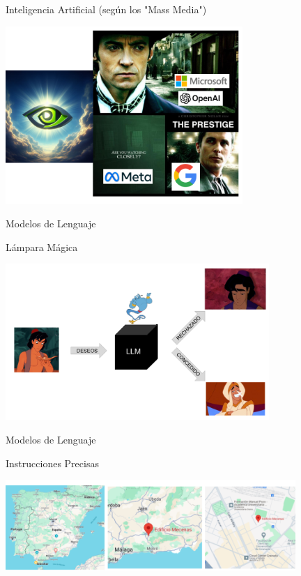 \documentclass[table, unknownkeysallowed, 10pt]{beamer}
\begin{document}
\begin{frame}{Inteligencia Artificial (según los "Mass Media")}

    \begin{center}
        \includegraphics[width=9cm]{imagenes/final_trick.png}
    \end{center}

\end{frame}

\begin{frame}{Modelos de Lenguaje}

    \begin{block}{Lámpara Mágica}
        \begin{center}
            \includegraphics[width=10cm]{imagenes/llm-blacbox.png}
        \end{center}
    \end{block}

\end{frame}

\begin{frame}{Modelos de Lenguaje}

    \begin{block}{Instrucciones Precisas}
        \begin{center}
            \includegraphics[width=11cm]{imagenes/prompts.png}
        \end{center}
    \end{block}


\end{frame}
\end{document}
